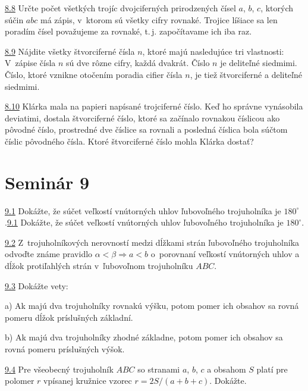 \noindent \ul{8.8}   Určte počet všetkých trojíc dvojciferných prirodzených čísel $a$, $b$, $c$, ktorých súčin $abc$ má zápis, v~ktorom sú všetky cifry rovnaké. Trojice líšiace sa len poradím čísel považujeme za rovnaké,  t.\,j. započítavame ich iba raz.




\noindent \ul{8.9}  Nájdite všetky štvorciferné čísla $n$, ktoré majú nasledujúce tri vlastnosti: V~zápise čísla $n$ sú dve rôzne cifry, každá dvakrát. Číslo $n$ je deliteľné siedmimi. Číslo, ktoré vznikne otočením poradia cifier čísla $n$, je tiež štvorciferné a deliteľné siedmimi.




\noindent \ul{8.10}  Klárka mala na papieri napísané trojciferné číslo. Keď ho správne vynásobila deviatimi, dostala štvorciferné číslo, ktoré sa začínalo rovnakou číslicou ako pôvodné číslo, prostredné dve číslice sa rovnali a posledná číslica bola súčtom číslic pôvodného čísla. Ktoré štvorciferné číslo mohla Klárka dostať?




\section*{Seminár 9}

\noindent \ul{9.1} Dokážte, že súčet veľkostí vnútorných uhlov ľubovoľného trojuholníka je $180^\circ$.\ul{9.1} Dokážte, že súčet veľkostí vnútorných uhlov ľubovoľného trojuholníka je $180^\circ$.




\noindent \ul{9.2}  Z~trojuholníkových nerovností medzi dĺžkami strán ľubovoľného trojuholníka odvoďte známe
pravidlo $\alpha < \beta \Rightarrow a < b$ o~porovnaní veľkostí vnútorných uhlov a dĺžok protiľahlých strán v~ľubovoľnom trojuholníku $ABC$.




\noindent \ul{9.3}  Dokážte vety:

a) Ak majú dva trojuholníky rovnakú výšku, potom pomer ich obsahov sa rovná pomeru dĺžok príslušných základní.

b) Ak majú dva trojuholníky zhodné základne, potom pomer ich obsahov sa rovná pomeru príslušných výšok.




\noindent \ul{9.4}   Pre všeobecný trojuholník $ABC$ so stranami $a$, $b$, $c$ a obsahom $S$ platí pre polomer $r$ vpísanej kružnice vzorec $r = 2S/(a + b + c)$. Dokážte.




